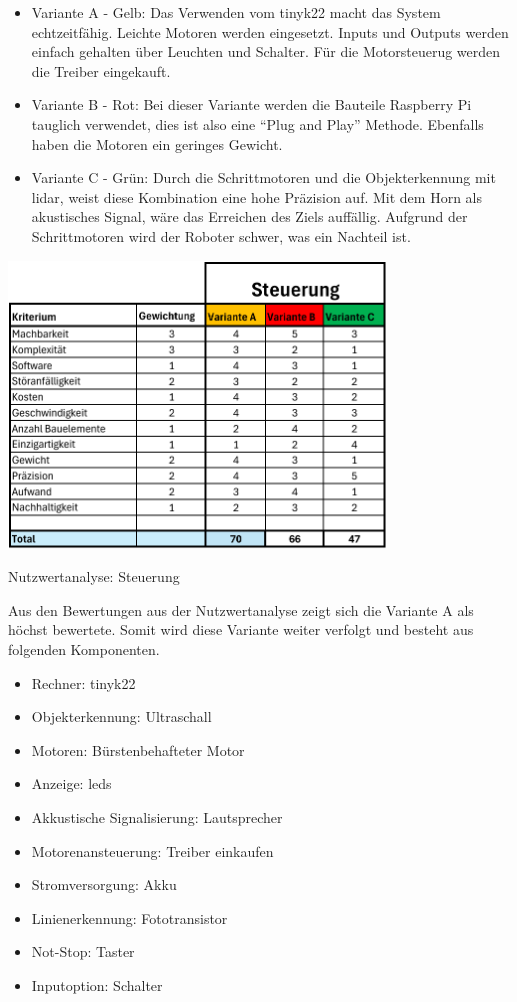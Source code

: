 \begin{itemize}
    \item Variante A - Gelb: Das Verwenden vom \gls{tinyk22} macht das System echtzeitfähig. Leichte Motoren werden eingesetzt. Inputs und Outputs werden einfach gehalten über Leuchten und Schalter. Für die Motorsteuerug werden die Treiber eingekauft.
    \item Variante B - Rot: Bei dieser Variante werden die Bauteile Raspberry Pi tauglich verwendet, dies ist also eine ``Plug and Play'' Methode. Ebenfalls haben die Motoren ein geringes Gewicht.
    \item Variante C - Grün: Durch die Schrittmotoren und die Objekterkennung mit \acrfull{lidar}, weist diese Kombination eine hohe Präzision auf. Mit dem Horn als akustisches Signal, wäre das Erreichen des Ziels auffällig. Aufgrund der Schrittmotoren wird der Roboter schwer, was ein Nachteil ist.
\end{itemize}


\begin{table}[H]
\centering
\includegraphics[width=0.75\textwidth]{assets/Nutzwertanalyse-ET.pdf}
\caption{Nutzwertanalyse: Steuerung}
\label{table:nutzwert-ET}
\end{table}

Aus den Bewertungen aus der Nutzwertanalyse zeigt sich die Variante A als höchst bewertete. Somit wird diese Variante weiter verfolgt und besteht aus folgenden Komponenten.

\begin{itemize}
    \item Rechner: \gls{tinyk22}
    \item Objekterkennung: Ultraschall
    \item Motoren: Bürstenbehafteter Motor
    \item Anzeige: \acrshort{led}s
    \item Akkustische Signalisierung: Lautsprecher
    \item Motorenansteuerung: Treiber einkaufen
    \item Stromversorgung: Akku
    \item Linienerkennung: Fototransistor
    \item Not-Stop: Taster
    \item Inputoption: Schalter
\end{itemize}

